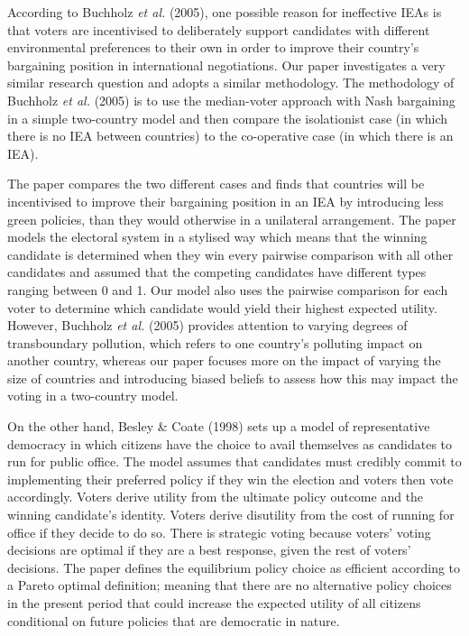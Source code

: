 \documentclass[11pt,preprint, authoryear]{elsarticle}
\numberwithin{equation}{section}
\numberwithin{figure}{section}
\numberwithin{table}{section}
\begin{document}
According to Buchholz \emph{et al.} (2005), one possible reason for
ineffective IEAs is that voters are incentivised to deliberately support
candidates with different environmental preferences to their own in
order to improve their country's bargaining position in international
negotiations. Our paper investigates a very similar research question
and adopts a similar methodology. The methodology of Buchholz \emph{et
al.} (2005) is to use the median-voter approach with Nash bargaining in
a simple two-country model and then compare the isolationist case (in
which there is no IEA between countries) to the co-operative case (in
which there is an IEA).

The paper compares the two different cases and finds that countries will
be incentivised to improve their bargaining position in an IEA by
introducing less green policies, than they would otherwise in a
unilateral arrangement. The paper models the electoral system in a
stylised way which means that the winning candidate is determined when
they win every pairwise comparison with all other candidates and assumed
that the competing candidates have different types ranging between 0 and
1. Our model also uses the pairwise comparison for each voter to
determine which candidate would yield their highest expected utility.
However, Buchholz \emph{et al.} (2005) provides attention to varying
degrees of transboundary pollution, which refers to one country's
polluting impact on another country, whereas our paper focuses more on
the impact of varying the size of countries and introducing biased
beliefs to assess how this may impact the voting in a two-country model.

On the other hand, Besley \& Coate (1998) sets up a model of
representative democracy in which citizens have the choice to avail
themselves as candidates to run for public office. The model assumes
that candidates must credibly commit to implementing their preferred
policy if they win the election and voters then vote accordingly. Voters
derive utility from the ultimate policy outcome and the winning
candidate's identity. Voters derive disutility from the cost of running
for office if they decide to do so. There is strategic voting because
voters' voting decisions are optimal if they are a best response, given
the rest of voters' decisions. The paper defines the equilibrium policy
choice as efficient according to a Pareto optimal definition; meaning
that there are no alternative policy choices in the present period that
could increase the expected utility of all citizens conditional on
future policies that are democratic in nature.
\end{document}
